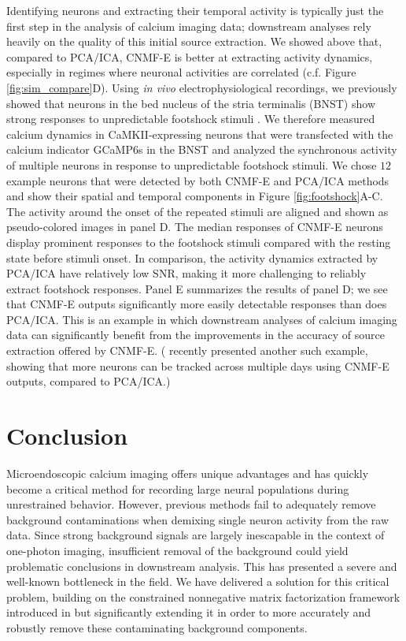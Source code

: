 \documentclass[9pt,lineno]{elife}
\begin{document}
Identifying neurons and extracting their temporal activity is typically just the first step in the analysis of calcium imaging data; downstream analyses rely heavily on the quality of this initial source extraction.  We showed above that, compared to PCA/ICA, CNMF-E is better at extracting activity dynamics, especially in regimes where neuronal activities are correlated (c.f. Figure \ref{fig:sim_compare}D). Using \emph{in vivo} electrophysiological recordings, we previously showed that neurons in the bed nucleus of the stria terminalis (BNST) show strong responses to unpredictable footshock stimuli \citep{Jennings2013}.  We therefore measured calcium dynamics in CaMKII-expressing neurons that were transfected with the calcium indicator GCaMP6s in the BNST and analyzed the synchronous activity of multiple neurons in response to unpredictable footshock stimuli.  We chose $12$ example neurons that were detected by both CNMF-E and PCA/ICA methods and show their spatial and temporal components in Figure \ref{fig:footshock}A-C. The activity around the onset of the repeated stimuli are aligned and shown as pseudo-colored images in panel D. The median responses of CNMF-E neurons display prominent responses to the footshock stimuli compared with the resting state before stimuli onset.  In comparison, the activity dynamics extracted by PCA/ICA have relatively low SNR, making it more challenging to reliably extract footshock responses. Panel E summarizes the results of panel D; we see that CNMF-E outputs significantly more easily detectable responses than does PCA/ICA.  This is an example in which downstream analyses of calcium imaging data can significantly benefit from the improvements in the accuracy of source extraction offered by CNMF-E.  (\citet{sheintuch2017tracking} recently presented another such example, showing that more neurons can be tracked across multiple days using CNMF-E outputs, compared to PCA/ICA.)

\section{Conclusion}
Microendoscopic calcium imaging offers unique advantages and has quickly become a critical method for recording large neural populations during unrestrained behavior.  However, previous methods fail to adequately remove background contaminations when demixing single neuron activity from the raw data. Since strong background signals are largely inescapable in the context of one-photon imaging, insufficient removal of the background could yield problematic conclusions in downstream analysis. This has presented a severe and well-known bottleneck in the field.  We have delivered a solution for this critical problem, building on the constrained nonnegative matrix factorization framework introduced in \citet{Pnevmatikakis2016} but significantly extending it in order to more accurately and robustly remove these contaminating background components. 
\end{document}
